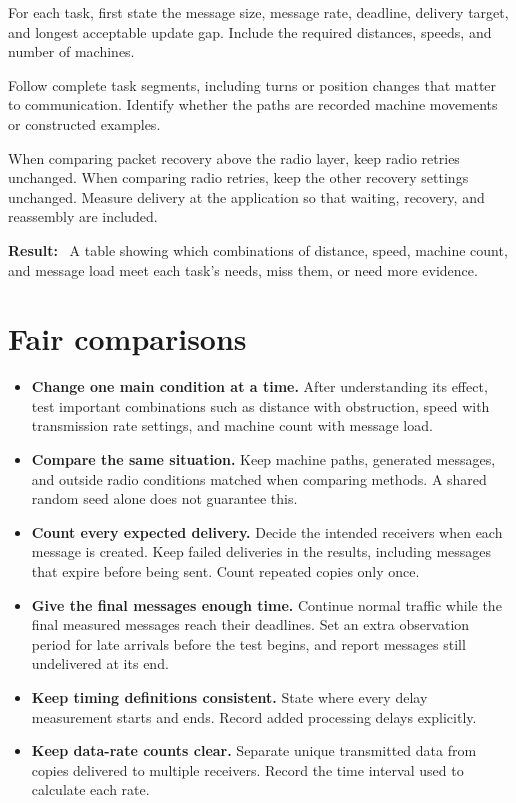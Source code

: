 \documentclass[11pt,a4paper]{article}
\newcommand{\field}[1]{\textbf{#1:}~}
\begin{document}
For each task, first state the message size, message rate, deadline, delivery
target, and longest acceptable update gap. Include the required distances,
speeds, and number of machines.

Follow complete task segments, including turns or position changes that matter
to communication. Identify whether the paths are recorded machine movements
or constructed examples.

When comparing packet recovery above the radio layer, keep radio retries
unchanged. When comparing radio retries, keep the other recovery settings
unchanged. Measure delivery at the application so that waiting, recovery,
and reassembly are included.

\field{Result} A table showing which combinations of distance, speed, machine
count, and message load meet each task's needs, miss them, or need more evidence.

\section{Fair comparisons}

\begin{itemize}
  \item \textbf{Change one main condition at a time.}
        After understanding its effect, test important combinations such as
        distance with obstruction, speed with transmission rate settings,
        and machine count with message load.
  \item \textbf{Compare the same situation.}
        Keep machine paths, generated messages, and outside radio conditions
        matched when comparing methods. A shared random seed alone does not
        guarantee this.
  \item \textbf{Count every expected delivery.}
        Decide the intended receivers when each message is created. Keep
        failed deliveries in the results, including messages that expire
        before being sent. Count repeated copies only once.
  \item \textbf{Give the final messages enough time.}
        Continue normal traffic while the final measured messages reach
        their deadlines. Set an extra observation period for late arrivals
        before the test begins, and report messages still undelivered at its end.
  \item \textbf{Keep timing definitions consistent.}
        State where every delay measurement starts and ends. Record added
        processing delays explicitly.
  \item \textbf{Keep data-rate counts clear.}
        Separate unique transmitted data from copies delivered to multiple
        receivers. Record the time interval used to calculate each rate.
\end{itemize}
\end{document}

